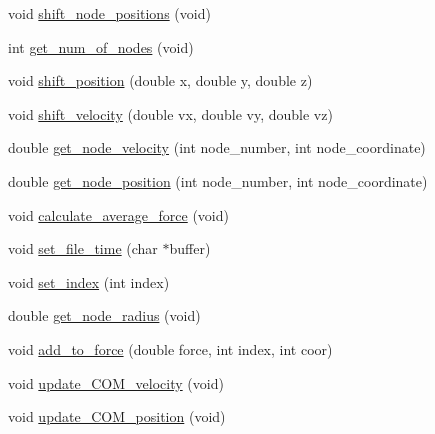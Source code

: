 \begin{DoxyCompactItemize}
\item 
void \mbox{\hyperlink{classChromatin_a1eb54e982903441e3b917da97bf1cf0b}{shift\+\_\+node\+\_\+positions}} (void)
\item 
int \mbox{\hyperlink{classChromatin_ac944e4ee8639490da43597ba8d29efea}{get\+\_\+num\+\_\+of\+\_\+nodes}} (void)
\item 
void \mbox{\hyperlink{classChromatin_a701278cbb0c1014ae62f479e2a9f6737}{shift\+\_\+position}} (double x, double y, double z)
\item 
void \mbox{\hyperlink{classChromatin_a49adafb5a81413b23a66f3a59d49d59c}{shift\+\_\+velocity}} (double vx, double vy, double vz)
\item 
double \mbox{\hyperlink{classChromatin_a8ba67062c2d842bacea17ade4d1545a3}{get\+\_\+node\+\_\+velocity}} (int node\+\_\+number, int node\+\_\+coordinate)
\item 
double \mbox{\hyperlink{classChromatin_a8e0ab06240f3a90708766c537b41e324}{get\+\_\+node\+\_\+position}} (int node\+\_\+number, int node\+\_\+coordinate)
\item 
void \mbox{\hyperlink{classChromatin_aa3e429b42938181fcd2fa156468c4b29}{calculate\+\_\+average\+\_\+force}} (void)
\item 
void \mbox{\hyperlink{classChromatin_a3187fb5d0aacdf6109af3bbb85a66aa9}{set\+\_\+file\+\_\+time}} (char $\ast$buffer)
\item 
void \mbox{\hyperlink{classChromatin_a58851cf29ad04948463857c99103ccd2}{set\+\_\+index}} (int index)
\item 
double \mbox{\hyperlink{classChromatin_a9dc3e8b66126b30c38c770a475a60f6d}{get\+\_\+node\+\_\+radius}} (void)
\item 
void \mbox{\hyperlink{classChromatin_a5bc9c714d620b6cd1f3b3a6d85dbd1d8}{add\+\_\+to\+\_\+force}} (double force, int index, int coor)
\item 
void \mbox{\hyperlink{classChromatin_ab732de686eb3f5db5ce402b58a5d8ea6}{update\+\_\+\+C\+O\+M\+\_\+velocity}} (void)
\item 
void \mbox{\hyperlink{classChromatin_a95a89f98d688ff8ca440fbef34086199}{update\+\_\+\+C\+O\+M\+\_\+position}} (void)
\end{DoxyCompactItemize}
